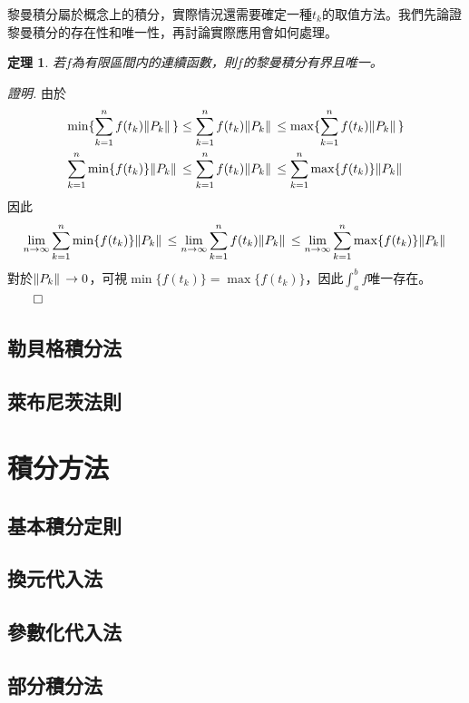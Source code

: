 \documentclass[12pt]{article}
\newtheorem*{theorem}{定理}
\renewenvironment*{proof}{\textit{證明.}}{\hfill$\qed$}
\begin{document}
    黎曼積分屬於概念上的積分，實際情況還需要確定一種$t_k$的取值方法。我們先論證黎曼積分的存在性和唯一性，再討論實際應用會如何處理。

    \begin{theorem}
        若$f$為有限區間内的連續函數，則$f$的黎曼積分有界且唯一。
    \end{theorem}
    \begin{proof}
        由於\begin{align*}
            \min\{\sum_{k=1}^{n}f(t_k)\norm*{P_k}\}\leq \sum_{k=1}^{n}f(t_k)\norm*{P_k}\leq \max\{\sum_{k=1}^{n}f(t_k)\norm*{P_k}\}\\
            \sum_{k=1}^{n}\min\{f(t_k)\}\norm*{P_k}\leq \sum_{k=1}^{n}f(t_k)\norm*{P_k}\leq \sum_{k=1}^{n}\max\{f(t_k)\}\norm*{P_k}
        \end{align*}
        因此\begin{align*}
            \lim_{n\to\infty}\sum_{k=1}^{n}\min\{f(t_k)\}\norm*{P_k}\leq \lim_{n\to\infty}\sum_{k=1}^{n}f(t_k)\norm*{P_k}\leq \lim_{n\to\infty}\sum_{k=1}^{n}\max\{f(t_k)\}\norm*{P_k}
        \end{align*}
        對於$\norm*{P_k}\to 0$，可視$\min\{f(t_k)\}=\max\{f(t_k)\}$，因此$\int_{a}^{b}f$唯一存在。
    \end{proof}
    \subsection*{勒貝格積分法}
    \subsection*{萊布尼茨法則}
    \section*{積分方法}
    \subsection*{基本積分定則}
    \subsection*{換元代入法}
    \subsection*{參數化代入法}
    \subsection*{部分積分法}
\end{document}
